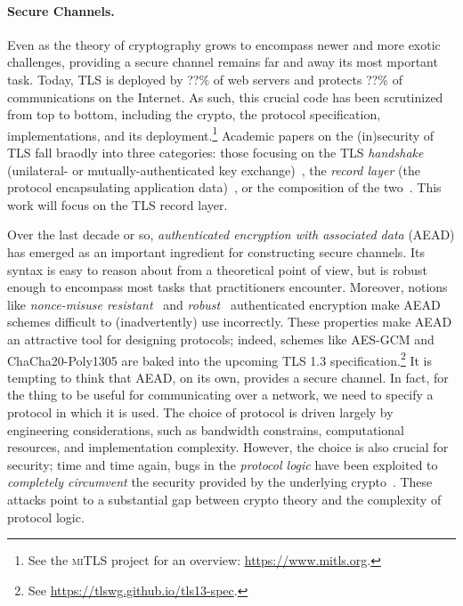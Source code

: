 \paragraph{Secure Channels. }
Even as the theory of cryptography grows to encompass newer and more exotic
challenges, providing a secure channel remains far and away its most mportant
task.
%
Today, TLS is deployed by ??\% of web servers and protects ??\% of
communications on the Internet. As such, this crucial code has been scrutinized
from top to bottom, including the crypto, the protocol specification,
implementations, and its deployment.\footnote{ See the \textsc{miTLS} project
for an overview: \url{https://www.mitls.org}.}
%
Academic papers on the (in)security of TLS fall braodly into three categories:
those focusing on the TLS \emph{handshake} (unilateral- or
mutually-authenticated key exchange)~\cite{BNF+14,others}, the \emph{record
layer} (the protocol encapsulating application data)~\cite{PRS11}, or the
composition of the two~\cite{JKSS12,KPW13}. This work will focus on the TLS
record layer.

Over the last decade or so, \emph{authenticated encryption with associated data}
(AEAD) has emerged as an important ingredient for constructing secure channels.
%
Its syntax is easy to reason about from a theoretical point of view, but is
robust enough to encompass most tasks that practitioners encounter. Moreover,
notions like \emph{nonce-misuse resistant}~\cite{RS07} and
\emph{robust}~\cite{HKR14} authenticated encryption make AEAD schemes difficult
to (inadvertently) use incorrectly. These properties make AEAD an attractive
tool for designing protocols; indeed, schemes like AES-GCM and
ChaCha20\mbox{-}Poly1305 are baked into the upcoming TLS 1.3
specification.\footnote{ See \url{https://tlswg.github.io/tls13-spec}.}
%
%
It is tempting to think that AEAD, on its own, provides a secure channel. In
fact, for the thing to be useful for communicating over a network, we need to
specify a protocol in which it is used. The choice of protocol is driven largely
by engineering considerations, such as bandwidth constrains, computational
resources, and implementation complexity. However, the choice is also crucial
for security; time and time again, bugs in the \emph{protocol logic} have been
exploited to \emph{completely circumvent} the security provided by the
underlying crypto~\cite{BKN02}. These attacks point to a substantial gap between
crypto theory and the complexity of protocol logic.

